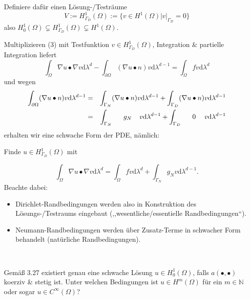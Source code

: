 \documentclass{book}
\newcommand{\assign}{:=}
\newcommand{\mathd}{\mathrm{d}}
\newcommand{\nobracket}{}
\newenvironment{enumerateroman}{\begin{enumerate}[i.] }{\end{enumerate}}
\newenvironment{itemizedot}{\begin{itemize} \renewcommand{\labelitemi}{$\bullet$}\renewcommand{\labelitemii}{$\bullet$}\renewcommand{\labelitemiii}{$\bullet$}\renewcommand{\labelitemiv}{$\bullet$}}{\end{itemize}}
\begin{document}
\begin{remark*}
\begin{enumerateroman}
    Definiere daf{\"u}r einen L{\"o}sung-/Testr{\"a}ume
    \[ V \assign H^1_{\Gamma_D} (\Omega) \assign \{ v \in H^1 (\Omega)  |
       \nobracket v |_{\Gamma_D} = 0 \nobracket \} \]
    also $H^1_0 (\Omega) \subsetneq H^1_{\Gamma_D} (\Omega) \subsetneq H^1
    (\Omega)$.
    
    Multiplizieren (3) mit Testfunktion $v \in H^1_{\Gamma_D} (\Omega)$,
    Integration \& partielle Integration liefert
    \[ \int_{\Omega} \nabla u \bullet \nabla v \mathd \lambda^d -
       \int_{\partial \Omega} (\nabla u \bullet n) v \mathd \lambda^{d - 1} =
       \int_{\Omega} f v \mathd \lambda^d \]
    und wegen
    \begin{eqnarray*}
      \int_{\partial \Omega} (\nabla u \bullet n) v \mathd \lambda^{d - 1} & =
      & \int_{\Gamma_N} (\nabla u \bullet n) v \mathd \lambda^{d - 1} +
      \int_{\Gamma_D} (\nabla u \bullet n) v \mathd \lambda^{d - 1}\\
      & = & \int_{\Gamma_N} \text{{\hspace{1.5em}}} g_N \hspace{1.1em} v
      \mathd \lambda^{d - 1} + \int_{\Gamma_D} \text{{\hspace{1.5em}}} 0
      \hspace{1.25em} v \mathd \lambda^{d - 1}
    \end{eqnarray*}
    erhalten wir eine schwache Form der PDE, n{\"a}mlich:
    
    Finde $u \in H^1_{\Gamma_D} (\Omega)$ mit
    
    
    \[ \int_{\Omega} \nabla u \bullet \nabla v \mathd \lambda^d =
       \int_{\Omega} f v \mathd \lambda^d + \int_{\Gamma_N} g_N v \mathd
       \lambda^{d - 1} . \]
    Beachte dabei:
    \begin{itemizedot}
      \item Dirichlet-Randbedingungen werden also in Konstruktion des
      L{\"o}sungs-/Testraums eingebaut (,,wesentliche/essentielle
      Randbedingungen``).
      
      \item Neumann-Randbedingungen werden {\"u}ber Zusatz-Terme in schwacher
      Form behandelt (nat{\"u}rliche Randbedingungen).
    \end{itemizedot}
  \end{enumerateroman}
\end{remark*}

\

Gem{\"a}{\ss} 3.27 existiert genau eine schwache L{\"o}sung $u \in H^1_0
(\Omega)$, falls $a (\bullet, \bullet)$ koerziv \& stetig ist. Unter welchen
Bedingungen ist $u \in H^m (\Omega)$ f{\"u}r ein $m \in \mathbb{N}$ oder sogar
$u \in C^{\infty} (\Omega)$?
\end{document}

